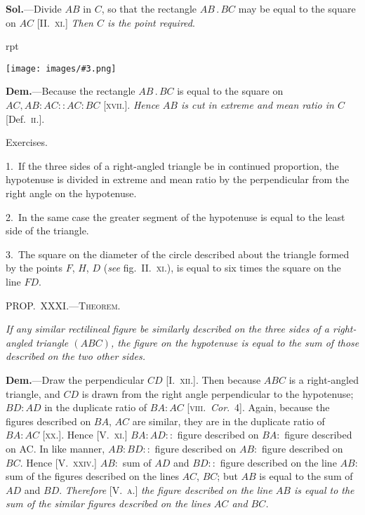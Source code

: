 \documentclass[oneside]{book}
\newcounter{wrapwidth}
\newcommand\mypropl[2]{
\bigskip\Needspace*{4\baselineskip}\begin{center}\textsc{#1}\end{center}
\hspace{\parindent}\emph{#2}\par\medskip
}
\newcommand\exhead[1]{
\Needspace*{5\baselineskip}\begin{center}
\textsf{#1}
\end{center}
}
\newcommand\imgflow[3]{
\setcounter{wrapwidth}{#1}
\begin{wrapfigure}[#2]{r}{\value{wrapwidth}pt}
\begin{center}
\vspace{-0.3in}
\texttt{[image: images/\#3.png]}
\end{center}
\end{wrapfigure}
}
\begin{document}
\textbf{Sol.}---Divide $AB$ in $C$, so that the rectangle $AB\,.\,BC$
may be equal to the square on $AC$
[II\@.~\textsc{xi}.] \textit{Then $C$ is the point required}.

\imgflow{110}{2}{f259}

\textbf{Dem.}---Because the rectangle $AB\,.\,BC$ is equal to the
square on $AC, AB:AC::AC:BC$ [\textsc{xvii}.]. \textit{Hence $AB$
is cut in extreme and mean ratio in $C$} [Def.~\textsc{ii}.].

\exhead{Exercises.}

\begin{footnotesize}
1.~If the three sides of a right-angled triangle be in continued
proportion, the hypotenuse is divided in extreme and mean ratio
by the perpendicular from the right angle on the hypotenuse.

2.~In the same case the greater segment of the hypotenuse is
equal to the least side of the triangle.

3.~The square on the diameter of the circle described about the
triangle formed by the points $F$, $H$, $D$ (\textit{see} fig.~II\@.\ \textsc{xi}.), is equal to
six times the square on the line $FD$.
\par\end{footnotesize}

\mypropl{PROP\@.~XXXI\@.---Theorem.}{If any similar rectilineal figure be similarly described
on the three sides of a right-angled triangle $(ABC)$, the
figure on the hypotenuse is equal to the sum of those described
on the two other sides.}

\textbf{Dem.}---Draw the perpendicular $CD$ [I.~\textsc{xii}.]. Then
because $ABC$ is a right-angled triangle, and $CD$ is
drawn from the right angle perpendicular to the hypotenuse;
$BD:AD$ in the duplicate ratio of $BA:AC$
[\textsc{viii}.~\textit{Cor}.~4]. Again, because the figures described
on $BA$, $AC$ are similar, they are in the duplicate ratio
of $BA:AC$ [\textsc{xx}.]. Hence [V.~\textsc{xi}.] $BA : AD ::$ figure
described on $BA :$ figure described on AC\@. In like
manner, $AB : BD ::$ figure described on $AB :$ figure
described on $BC$. Hence [V.~\textsc{xxiv}.] $AB :$ sum of $AD$
and $BD ::$ figure described on the line $AB :$ sum of
the figures described on the lines $AC$, $BC$; but $AB$
is equal to the sum of $AD$ and $BD$.
\textit{Therefore} [V.~\textsc{a}.] \textit{the figure described on the line $AB$ is equal to the sum of
the similar figures described on the lines $AC$ and $BC$.}
\end{document}
